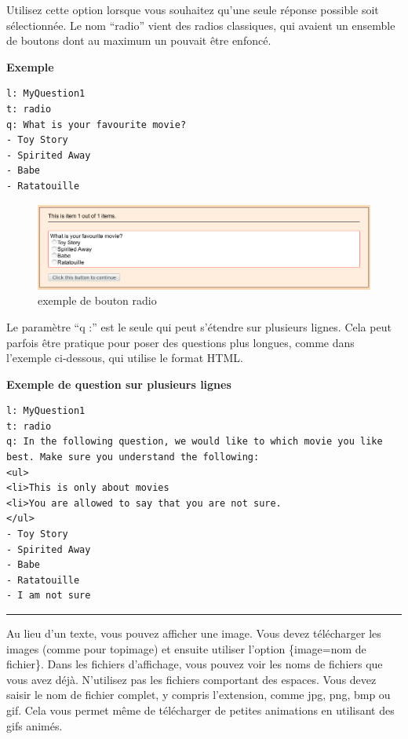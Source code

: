 \documentclass[
]{book}
\begin{document}
Utilisez cette option lorsque vous souhaitez qu'une seule réponse possible soit sélectionnée. Le nom ``radio'' vient des radios classiques, qui avaient un ensemble de boutons dont au maximum un pouvait être enfoncé.

\textbf{Exemple}

\begin{verbatim}
l: MyQuestion1
t: radio
q: What is your favourite movie?
- Toy Story
- Spirited Away
- Babe
- Ratatouille
\end{verbatim}

\begin{figure}
\centering
\includegraphics{img/question1.png}
\caption{exemple de bouton radio}
\end{figure}

Le paramètre ``q :'' est le seule qui peut s'étendre sur plusieurs lignes. Cela peut parfois être pratique pour poser des questions plus longues, comme dans l'exemple ci-dessous, qui utilise le format HTML.

\textbf{Exemple de question sur plusieurs lignes}

\begin{verbatim}
l: MyQuestion1
t: radio
q: In the following question, we would like to which movie you like
best. Make sure you understand the following:
<ul>
<li>This is only about movies
<li>You are allowed to say that you are not sure.
</ul>
- Toy Story
- Spirited Away
- Babe
- Ratatouille
- I am not sure
\end{verbatim}

\begin{center}\rule{0.5\linewidth}{0.5pt}\end{center}

Au lieu d'un texte, vous pouvez afficher une image. Vous devez télécharger les images (comme pour topimage) et ensuite utiliser l'option \{image=nom de fichier\}. Dans les fichiers d'affichage, vous pouvez voir les noms de fichiers que vous avez déjà. N'utilisez pas les fichiers comportant des espaces. Vous devez saisir le nom de fichier complet, y compris l'extension, comme jpg, png, bmp ou gif. Cela vous permet même de télécharger de petites animations en utilisant des gifs animés.
\end{document}
